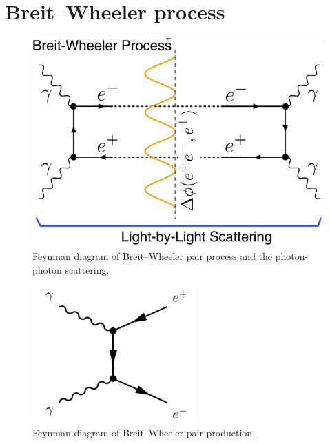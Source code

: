 \documentclass{article}
\begin{document}
\section{Breit–Wheeler process}

\begin{figure}[!th]
	\centering
	\includegraphics[width=0.5\linewidth]{figures/Breit-Wheeler.png}
	\caption{Feynman diagram of Breit–Wheeler pair process and the photon-photon scattering.}
	\label{fig:Feynman-diagram-of-Breit–Wheeler}
\end{figure}

\begin{figure}[!th]
	\centering
	\includegraphics[width=0.5\linewidth]{figures/Feynman-Breit.png}
	\caption{Feynman diagram of Breit–Wheeler pair production.}
	\label{fig:Breit–Wheeler-pair}
\end{figure}
\end{document}
